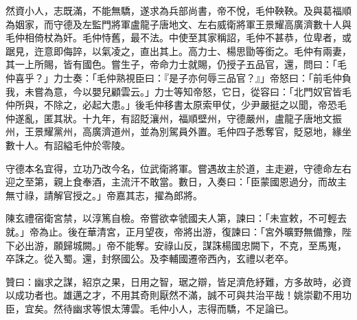 \begin{pinyinscope}
 然資小人，志既滿，不能無驕，遂求為兵部尚書，帝不悅，毛仲鞅鞅。及與葛福順為姻家，而守德及左監門將軍盧龍子唐地文、左右威衛將軍王景耀高廣濟數十人與毛仲相倚杖為奸。毛仲恃舊，最不法。中使至其家稱詔，毛仲不甚恭，位卑者，或踞見，迕意即侮誶，以氣凌之，直出其上。高力士、楊思勖等銜之。毛仲有兩妻，其一上所賜，皆有國色。嘗生子，帝命力士就賜，仍授子五品官，還，問曰：「毛仲喜乎？」力士奏：「毛仲熟視臣曰：『是子亦何辱三品官？』」帝怒曰：「前毛仲負我，未嘗為意，今以嬰兒顧雲云。」力士等知帝怒，它日，從容曰：「北門奴官皆毛仲所與，不除之，必起大患。」後毛仲移書太原索甲仗，少尹嚴挺之以聞，帝恐毛仲遂亂，匿其狀。十九年，有詔貶瀼州，福順壁州，守德嚴州，盧龍子唐地文振州，王景耀黨州，高廣濟道州，並為別駕員外置。毛仲四子悉奪官，貶惡地，緣坐數十人。有詔縊毛仲於零陵。



 守德本名宜得，立功乃改今名，位武衛將軍。嘗遇故主於道，主走避，守德命左右迎之至第，親上食奉酒，主流汗不敢當。數日，入奏曰：「臣蒙國恩過分，而故主無寸祿，請解官授之。」帝嘉其志，擢為郎將。



 陳玄禮宿衛宮禁，以淳篤自檢。帝嘗欲幸虢國夫人第，諫曰：「未宣敕，不可輕去就。」帝為止。後在華清宮，正月望夜，帝將出游，復諫曰：「宮外曠野無備豫，陛下必出游，願歸城闕。」帝不能奪。安祿山反，謀誅楊國忠闕下，不克，至馬嵬，卒誅之。從入蜀。還，封祭國公。及李輔國遷帝西內，玄禮以老卒。



 贊曰：幽求之謀，紹京之果，日用之智，琚之辯，皆足濟危紓難，方多故時，必資以成功者也。雄邁之才，不用其奇則厭然不滿，誠不可與共治平哉！姚崇勸不用功臣，宜矣。然待幽求等恨太薄雲。毛仲小人，志得而驕，不足論已。



\end{pinyinscope}